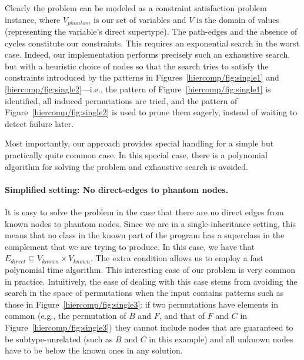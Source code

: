 
Clearly the problem can be modeled as a constraint satisfaction
problem instance, where $V_{phantom}$ is our set of variables and $V$
is the domain of values (representing the variable's direct
supertype). The path-edges and the absence of cycles constitute our
constraints. This requires an exponential search in the worst
case. Indeed, our implementation performs precisely such an exhaustive
search, but with a heuristic choice of nodes so that the search tries
to satisfy the constraints introduced by the patterns in
Figures~\ref{hiercomp/fig:single1} and
\ref{hiercomp/fig:single2}---i.e., the pattern of
Figure~\ref{hiercomp/fig:single1} is identified, all induced
permutations are tried, and the pattern of
Figure~\ref{hiercomp/fig:single2} is used to prune them eagerly,
instead of waiting to detect failure later.

Most importantly, our approach provides special handling for a
simple but practically quite common case. In this special case,
there is a polynomial algorithm for solving the problem and exhaustive
search is avoided.



\paragraph{Simplified setting: No direct-edges to phantom nodes.}

It is easy to solve the problem in the case that there are no direct
edges from known nodes to phantom nodes. Since we are in a
single-inheritance setting, this means that no class in the known part
of the program has a superclass in the complement that we are trying
to produce. In this case, we have that $E_{direct} \subseteq
V_{known}\times V_{known}$. The extra condition allows us to employ a
fast polynomial time algorithm. This interesting case of our problem
is very common in practice. Intuitively, the ease of dealing with this
case stems from avoiding the search in the space of permutations when
the input contains patterns such as those in Figure~\ref{hiercomp/fig:single3}:
if two permutations have elements in common (e.g., the permutation of
$B$ and $F$, and that of $F$ and $C$ in Figure~\ref{hiercomp/fig:single3}) they
cannot include nodes that are guaranteed to be subtype-unrelated (such
as $B$ and $C$ in this example) and all unknown nodes have to be below
the known ones in any solution.

